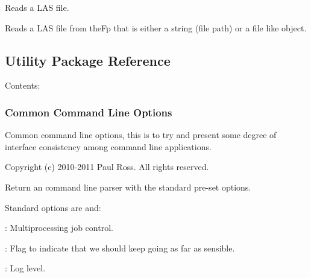 \documentclass[letterpaper,10pt,english]{sphinxmanual}
\begin{document}
\begin{fulllineitems}
\label{\detokenize{ref/LAS/core/LASRead:TotalDepth.LAS.core.LASRead.LASRead}}
Reads a LAS file.

\begin{fulllineitems}
\label{\detokenize{ref/LAS/core/LASRead:TotalDepth.LAS.core.LASRead.LASRead.__init__}}
Reads a LAS file from theFp that is either a string (file path) or a file like object.

\end{fulllineitems}


\end{fulllineitems}



\subsection{Utility Package Reference}
\label{\detokenize{ref/util/index_util::doc}}\label{\detokenize{ref/util/index_util:utility-package-reference}}
Contents:


\subsubsection{Common Command Line Options}
\label{\detokenize{ref/util/CmnCmdOpts:common-command-line-options}}\label{\detokenize{ref/util/CmnCmdOpts::doc}}\label{\detokenize{ref/util/CmnCmdOpts:module-TotalDepth.util.CmnCmdOpts}}
Common command line options, this is to try and present some degree of
interface consistency among command line applications.

Copyright (c) 2010-2011 Paul Ross. All rights reserved.

\begin{fulllineitems}
\label{\detokenize{ref/util/CmnCmdOpts:TotalDepth.util.CmnCmdOpts.argParser}}
Return an command line parser with the standard pre-set options.

Standard options are  and:

: Multiprocessing job control.

: Flag to indicate that we should keep going as far as sensible.

: Log level.

\end{fulllineitems}
\end{document}
